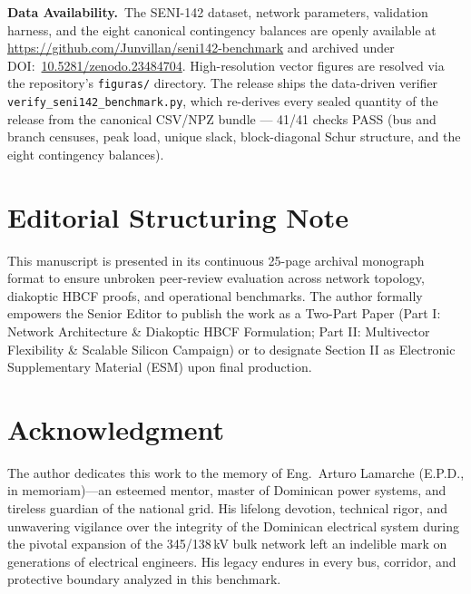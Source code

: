 \documentclass[10pt, journal]{IEEEtran}
\begin{document}








\noindent\textbf{Data Availability.}~The SENI-142 dataset, network parameters, validation harness, and the eight canonical contingency balances are openly available at \url{https://github.com/Junvillan/seni142-benchmark} and archived under DOI:~\href{https://doi.org/10.5281/zenodo.23484704}{10.5281/zenodo.23484704}. High-resolution vector figures are resolved via the repository's \texttt{figuras/} directory. The release ships the data-driven verifier \texttt{verify\_seni142\_benchmark.py}, which re-derives every sealed quantity of the release from the canonical CSV/NPZ bundle --- 41/41 checks PASS (bus and branch censuses, peak load, unique slack, block-diagonal Schur structure, and the eight contingency balances).

\section*{Editorial Structuring Note}
This manuscript is presented in its continuous 25-page archival monograph format to ensure unbroken peer-review evaluation across network topology, diakoptic HBCF proofs, and operational benchmarks. The author formally empowers the Senior Editor to publish the work as a Two-Part Paper (Part I: Network Architecture \& Diakoptic HBCF Formulation; Part II: Multivector Flexibility \& Scalable Silicon Campaign) or to designate Section II as Electronic Supplementary Material (ESM) upon final production.

\section*{Acknowledgment}
The author dedicates this work to the memory of Eng.~Arturo Lamarche (E.P.D., in memoriam)---an esteemed mentor, master of Dominican power systems, and tireless guardian of the national grid. His lifelong devotion, technical rigor, and unwavering vigilance over the integrity of the Dominican electrical system during the pivotal expansion of the 345/138\,kV bulk network left an indelible mark on generations of electrical engineers. His legacy endures in every bus, corridor, and protective boundary analyzed in this benchmark.



\end{document}
